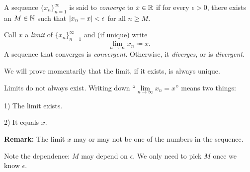 \documentclass[10pt,aspectratio=169]{beamer}
\begin{document}
\begin{frame}
\begin{definition}
A sequence $\{ x_n \}_{n=1}^\infty$ is said to \emph{converge} to
$x \in {\mathbb{R}}$ if for every $\epsilon > 0$, there exists an $M \in {\mathbb{N}}$ such
that $\left\lvert {x_n - x} \right\rvert < \epsilon$ for all $n \geq M$.
\pause

Call $x$ a \emph{limit} of $\{ x_n \}_{n=1}^\infty$ and (if unique) write
\begin{equation*}
\lim_{n\to \infty} x_n \coloneqq x .
\end{equation*}
\pause
A sequence
that converges is \emph{convergent}.
Otherwise, it \emph{diverges}, or is \emph{divergent}.
\end{definition}

\pause

We will prove momentarily that the limit,
if it exists, is always unique.

\pause
\medskip

Limits do not always exist.
\pause
Writing down ``$\lim\limits_{n\to\infty} x_n = x$'' means two things:

1) The limit exists.

2) It equals $x$.

\pause
\medskip

\textbf{Remark:}
The limit $x$ may or may not be one of the numbers in the sequence.

\pause
\medskip

Note the dependence: $M$ may depend on $\epsilon$.  We only need to pick $M$
once we know $\epsilon$.
\end{frame}

\begin{frame}
\centering
{}

\medskip

\end{frame}
\end{document}
